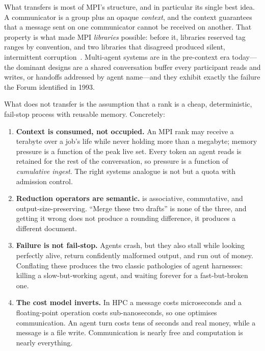 What transfers is most of MPI's structure, and in particular its single best
idea. A communicator is a group plus an opaque \emph{context}, and the
context guarantees that a message sent on one communicator cannot be
received on another. That property is what made MPI \emph{libraries}
possible: before it, libraries reserved tag ranges by convention, and two
libraries that disagreed produced silent, intermittent
corruption~\cite{skjellum1994zipcode,gropp2001learning}. Multi-agent systems
are in the pre-context era today---the dominant designs are a shared
conversation buffer every participant reads and writes, or handoffs
addressed by agent name---and they exhibit exactly the failure the Forum
identified in 1993.

What does not transfer is the assumption that a rank is a cheap,
deterministic, fail-stop process with reusable memory. Concretely:

\begin{enumerate}
\item \textbf{Context is consumed, not occupied.} An MPI rank may receive a
terabyte over a job's life while never holding more than a megabyte; memory
pressure is a function of the peak live set. Every token an agent reads is
retained for the rest of the conversation, so pressure is a function of
\emph{cumulative ingest}. The right systems analogue is not 
but a quota with admission control.

\item \textbf{Reduction operators are semantic.}  is
associative, commutative, and output-size-preserving. ``Merge these two
drafts'' is none of the three, and getting it wrong does not produce a
rounding difference, it produces a different document.

\item \textbf{Failure is not fail-stop.} Agents crash, but they also stall
while looking perfectly alive, return confidently malformed output, and run
out of money. Conflating these produces the two classic pathologies of agent
harnesses: killing a slow-but-working agent, and waiting forever for a
fast-but-broken one.

\item \textbf{The cost model inverts.} In HPC a message costs microseconds
and a floating-point operation costs sub-nanoseconds, so one optimises
communication. An agent turn costs tens of seconds and real money, while a
message is a file write. Communication is nearly free and computation is
nearly everything.
\end{enumerate}

